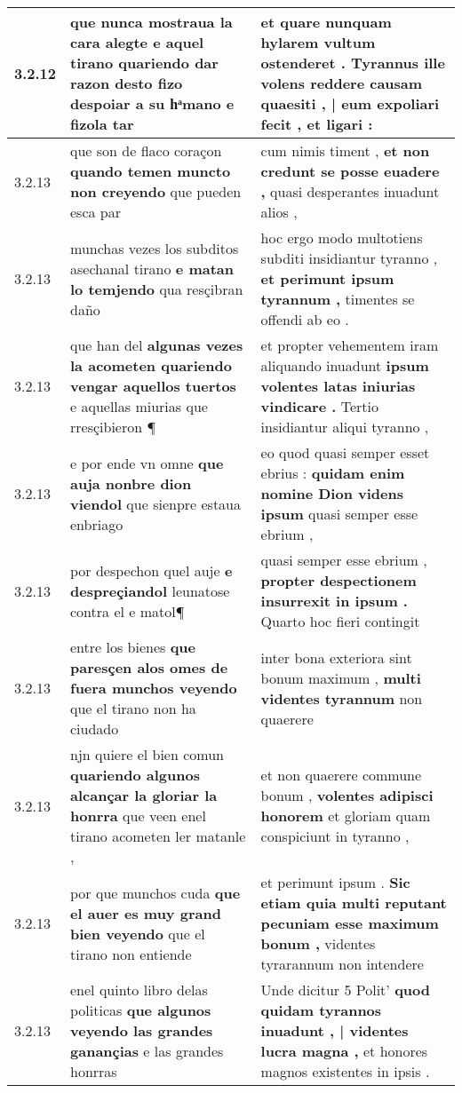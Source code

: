 \begin{tabular}{|p{1cm}|p{6.5cm}|p{6.5cm}|}
3.2.12 & que nunca mostraua la cara alegte \textbf{ e aquel tirano quariendo dar razon desto fizo despoiar a su hͣmano } e fizola tar & et quare nunquam hylarem vultum ostenderet . \textbf{ Tyrannus ille volens reddere causam quaesiti , | eum expoliari fecit , } et ligari : \\\hline
3.2.13 & que son de flaco coraçon \textbf{ quando temen muncto non creyendo } que pueden esca par & cum nimis timent , \textbf{ et non credunt se posse euadere , } quasi desperantes inuadunt alios , \\\hline
3.2.13 & munchas vezes los subditos asechanal tirano \textbf{ e matan lo temjendo } qua resçibran daño & hoc ergo modo multotiens subditi insidiantur tyranno , \textbf{ et perimunt ipsum tyrannum , } timentes se offendi ab eo . \\\hline
3.2.13 & que han del \textbf{ algunas vezes la acometen quariendo vengar aquellos tuertos } e aquellas miurias que rresçibieron ¶ & et propter vehementem iram aliquando inuadunt \textbf{ ipsum volentes latas iniurias vindicare . } Tertio insidiantur aliqui tyranno , \\\hline
3.2.13 & e por ende vn omne \textbf{ que auja nonbre dion viendol } que sienpre estaua enbriago & eo quod quasi semper esset ebrius : \textbf{ quidam enim nomine Dion videns ipsum } quasi semper esse ebrium , \\\hline
3.2.13 & por despechon quel auje \textbf{ e despreçiandol } leunatose contra el e matol¶ & quasi semper esse ebrium , \textbf{ propter despectionem insurrexit in ipsum . } Quarto hoc fieri contingit \\\hline
3.2.13 & entre los bienes \textbf{ que paresçen alos omes de fuera munchos veyendo } que el tirano non ha ciudado & inter bona exteriora sint bonum maximum , \textbf{ multi videntes tyrannum } non quaerere \\\hline
3.2.13 & njn quiere el bien comun \textbf{ quariendo algunos alcançar la gloriar la honrra } que veen enel tirano acometen ler matanle , & et non quaerere commune bonum , \textbf{ volentes adipisci honorem } et gloriam quam conspiciunt in tyranno , \\\hline
3.2.13 & por que munchos cuda \textbf{ que el auer es muy grand bien veyendo } que el tirano non entiende & et perimunt ipsum . \textbf{ Sic etiam quia multi reputant pecuniam esse maximum bonum , } videntes tyrarannum non intendere \\\hline
3.2.13 & enel quinto libro delas politicas \textbf{ que algunos veyendo las grandes ganançias } e las grandes honrras & Unde dicitur 5 Polit’ \textbf{ quod quidam tyrannos inuadunt , | videntes lucra magna , } et honores magnos existentes in ipsis . \\\hline

\end{tabular}
